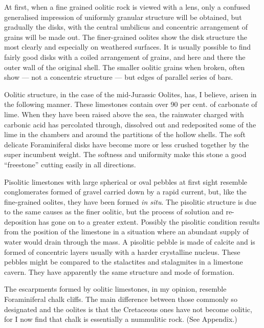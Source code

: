 \documentclass[a4paper, 12pt, oneside]{article}
\begin{document}
At first, when a fine grained oolitic rock is viewed with a lens, only a confused generalised impression of uniformly granular structure will be obtained, but gradually the disks, with the central umbilicus and concentric arrangement of grains will be made out. The finer-grained oolites show the disk structure the most clearly and especially on weathered surfaces. It is usually possible to find fairly good disks with a coiled arrangement of grains, and here and there the outer wall of the original shell. The smaller oolitic grains when broken, often show --- not a concentric structure --- but edges of parallel series of bars.

Oolitic structure, in the case of the mid-Jurassic Oolites, has, I believe, arisen in the following manner. These limestones contain over 90 per cent. of carbonate of lime. When they have been raised above the sea, the rainwater charged with carbonic acid has percolated through, dissolved out and redeposited some of the lime in the chambers and around the partitions of the hollow shells. The soft delicate Foraminiferal disks have become more or less crushed together by the super incumbent weight. The softness and uniformity make this stone a good ``freestone'' cutting easily in all directions.

Pisolitic limestones with large spherical or oval pebbles at first sight resemble conglomerates formed of gravel carried down by a rapid current, but, like the fine-grained oolites, they have been formed \emph{in situ}. The pisolitic structure is due to the same causes as the finer oolitic, but the process of solution and re-deposition has gone on to a greater extent. Possibly the pisolitic condition results from the position of the limestone in a situation where an abundant supply of water would drain through the mass. A pisolitic pebble is made of calcite and is formed of concentric layers usually with a harder crystalline nucleus. These pebbles might be compared to the stalactites and stalagmites in a limestone cavern. They have apparently the same structure and mode of formation.

The escarpments formed by oolitic limestones, in my opinion, resemble Foraminiferal chalk cliffs. The main difference between those commonly so designated and the oolites is that the Cretaceous ones have not become oolitic, for I now find that chalk is essentially a nummulitic rock. (See Appendix.)
\end{document}
